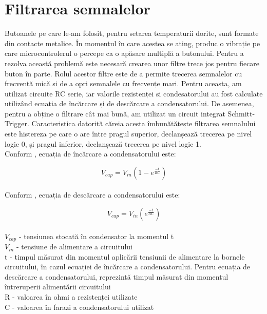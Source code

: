 \section{Filtrarea semnalelor}

	Butoanele pe care le-am folosit, pentru setarea temperaturii dorite, sunt formate din contacte metalice. În momentul în care acestea se ating, produc o vibrație pe care microcontrolerul o percepe ca o apăsare multiplă a butonului. Pentru a rezolva această problemă este necesară crearea unor filtre trece jos \cite{buttonDebouncing} pentru fiecare buton în parte. Rolul acestor filtre este de a permite trecerea semnalelor cu frecvență mică si de a opri semnalele cu frecvențe mari. Pentru aceasta, am utilizat circuite RC serie, iar valorile rezistenței si condesatorului au fost calculate utilizând ecuația de încărcare și de descărcare a condensatorului. De asemenea, pentru a obține o filtrare cât mai bună, am utilizat un circuit integrat Schmitt-Trigger. Caracteristica datorită căreia acesta îmbunătățește filtrarea semnalului este histereza pe care o are între pragul superior, declanșează trecerea pe nivel logic 0, și pragul inferior, declanșează trecerea pe nivel logic 1.  
\vspace{1em}\\
Conform \cite{buttonDebouncing}, ecuația de încărcare a condensatorului este:

\begin{equation}
V_{cap} = V_{in}(1-e^{\frac{-t}{RC}})
\end{equation}
\vspace{1em}\\
Conform \cite{buttonDebouncing}, ecuația de descărcare a condensatorului este:

\begin{equation}
V_{cap} = V_{in}(e^{\frac{-t}{RC}})                 
\end{equation}
\vspace{1em}\\
$V_{cap}$ - tensiunea stocată în condensator la momentul t
\vspace{0.7em}\\
$V_{in}$ - tensiune de alimentare a circuitului
\vspace{0.7em}\\
t - timpul măsurat din momentul aplicării tensiunii de alimentare la bornele circuitului, în cazul ecuației de încărcare a condensatorului. Pentru ecuația de descărcare a condensatorului, reprezintă timpul măsurat din momentul întreruperii alimentării circuitului
\vspace{0.7em}\\
R - valoarea în ohmi a rezistenței utilizate
\vspace{0.7em}\\
C - valoarea în farazi a condensatorului utilizat\\ 

